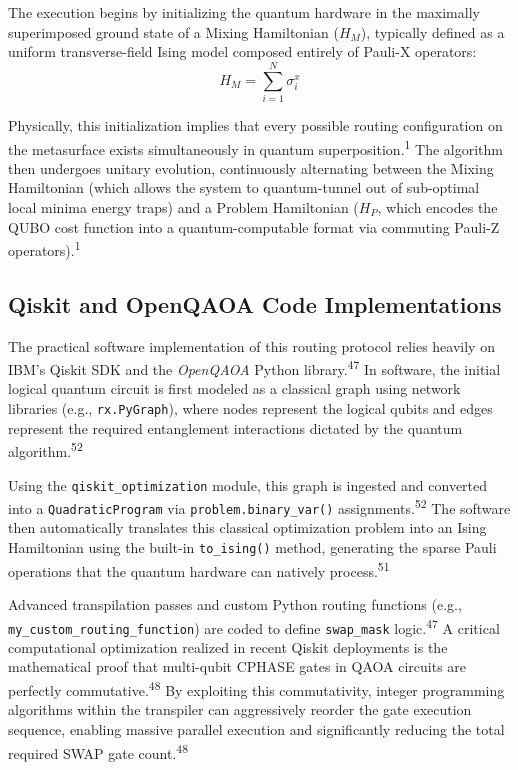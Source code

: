 \documentclass[11pt, a4paper]{article}
\begin{document}
The execution begins by initializing the quantum hardware in the maximally superimposed ground state of a Mixing Hamiltonian ($H_M$), typically defined as a uniform transverse-field Ising model composed entirely of Pauli-X operators:
\begin{equation}
H_M = \sum_{i=1}^N \sigma_i^x
\end{equation}

Physically, this initialization implies that every possible routing configuration on the metasurface exists simultaneously in quantum superposition.\textsuperscript{1} The algorithm then undergoes unitary evolution, continuously alternating between the Mixing Hamiltonian (which allows the system to quantum-tunnel out of sub-optimal local minima energy traps) and a Problem Hamiltonian ($H_P$, which encodes the QUBO cost function into a quantum-computable format via commuting Pauli-Z operators).\textsuperscript{1}

\subsection{Qiskit and OpenQAOA Code Implementations}

The practical software implementation of this routing protocol relies heavily on IBM's Qiskit SDK and the \textit{OpenQAOA} Python library.\textsuperscript{47} In software, the initial logical quantum circuit is first modeled as a classical graph using network libraries (e.g., \texttt{rx.PyGraph}), where nodes represent the logical qubits and edges represent the required entanglement interactions dictated by the quantum algorithm.\textsuperscript{52}

Using the \texttt{qiskit\_optimization} module, this graph is ingested and converted into a \texttt{QuadraticProgram} via \texttt{problem.binary\_var()} assignments.\textsuperscript{52} The software then automatically translates this classical optimization problem into an Ising Hamiltonian using the built-in \texttt{to\_ising()} method, generating the sparse Pauli operations that the quantum hardware can natively process.\textsuperscript{51}

Advanced transpilation passes and custom Python routing functions (e.g., \texttt{my\_custom\_routing\_function}) are coded to define \texttt{swap\_mask} logic.\textsuperscript{47} A critical computational optimization realized in recent Qiskit deployments is the mathematical proof that multi-qubit CPHASE gates in QAOA circuits are perfectly commutative.\textsuperscript{48} By exploiting this commutativity, integer programming algorithms within the transpiler can aggressively reorder the gate execution sequence, enabling massive parallel execution and significantly reducing the total required SWAP gate count.\textsuperscript{48}
\end{document}
